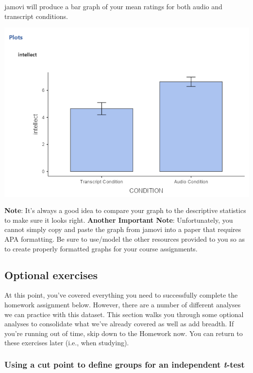 \documentclass[
]{book}
\begin{document}
jamovi will produce a bar graph of your mean ratings for both audio and transcript conditions.

\includegraphics{img/BarGraphForIndTTest.png}

\textbf{Note}: It's always a good idea to compare your graph to the descriptive statistics to make sure it looks right.
\textbf{Another Important Note}: Unfortunately, you cannot simply copy and paste the graph from jamovi into a paper that requires APA formatting. Be sure to use/model the other resources provided to you so as to create properly formatted graphs for your course assignments.

\hypertarget{optional-exercises}{%
\subsection{Optional exercises}\label{optional-exercises}}

At this point, you've covered everything you need to successfully complete the homework assignment below. However, there are a number of different analyses we can practice with this dataset. This section walks you through some optional analyses to consolidate what we've already covered as well as add breadth. If you're running out of time, skip down to the Homework now. You can return to these exercises later (i.e., when studying).

\hypertarget{using-a-cut-point-to-define-groups-for-an-independent-t-test-1}{%
\subsubsection{\texorpdfstring{Using a cut point to define groups for an independent \emph{t}-test}{Using a cut point to define groups for an independent t-test}}\label{using-a-cut-point-to-define-groups-for-an-independent-t-test-1}}
\end{document}
